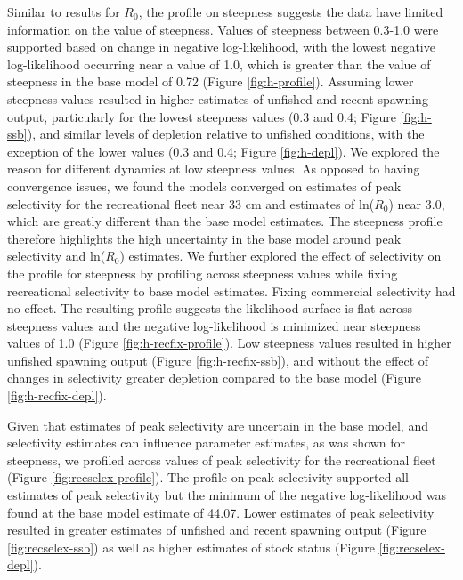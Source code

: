 \documentclass[11pt,
  english,
  a4paper,
]{article}
\begin{document}
Similar to results for {\(R_0\)\leavevmode\tagmcend\tagstructend}, the profile on steepness suggests the data have limited information on the value of steepness. Values of steepness between 0.3-1.0 were supported based on change in negative log-likelihood, with the lowest negative log-likelihood occurring near a value of 1.0, which is greater than the value of steepness in the base model of 0.72 (Figure \ref{fig:h-profile}). Assuming lower steepness values resulted in higher estimates of unfished and recent spawning output, particularly for the lowest steepness values (0.3 and 0.4; Figure \ref{fig:h-ssb}), and similar levels of depletion relative to unfished conditions, with the exception of the lower values (0.3 and 0.4; Figure \ref{fig:h-depl}). We explored the reason for different dynamics at low steepness values. As opposed to having convergence issues, we found the models converged on estimates of peak selectivity for the recreational fleet near 33 cm and estimates of ln({\(R_0\)\leavevmode\tagmcend\tagstructend}) near 3.0, which are greatly different than the base model estimates. The steepness profile therefore highlights the high uncertainty in the base model around peak selectivity and ln({\(R_0\)\leavevmode\tagmcend\tagstructend}) estimates. We further explored the effect of selectivity on the profile for steepness by profiling across steepness values while fixing recreational selectivity to base model estimates. Fixing commercial selectivity had no effect. The resulting profile suggests the likelihood surface is flat across steepness values and the negative log-likelihood is minimized near steepness values of 1.0 (Figure \ref{fig:h-recfix-profile}). Low steepness values resulted in higher unfished spawning output (Figure \ref{fig:h-recfix-ssb}), and without the effect of changes in selectivity greater depletion compared to the base model (Figure \ref{fig:h-recfix-depl}).

\leavevmode\tagmcend\tagstructend\par


Given that estimates of peak selectivity are uncertain in the base model, and selectivity estimates can influence parameter estimates, as was shown for steepness, we profiled across values of peak selectivity for the recreational fleet (Figure \ref{fig:recselex-profile}). The profile on peak selectivity supported all estimates of peak selectivity but the minimum of the negative log-likelihood was found at the base model estimate of 44.07. Lower estimates of peak selectivity resulted in greater estimates of unfished and recent spawning output (Figure \ref{fig:recselex-ssb}) as well as higher estimates of stock status (Figure \ref{fig:recselex-depl}).
\end{document}
